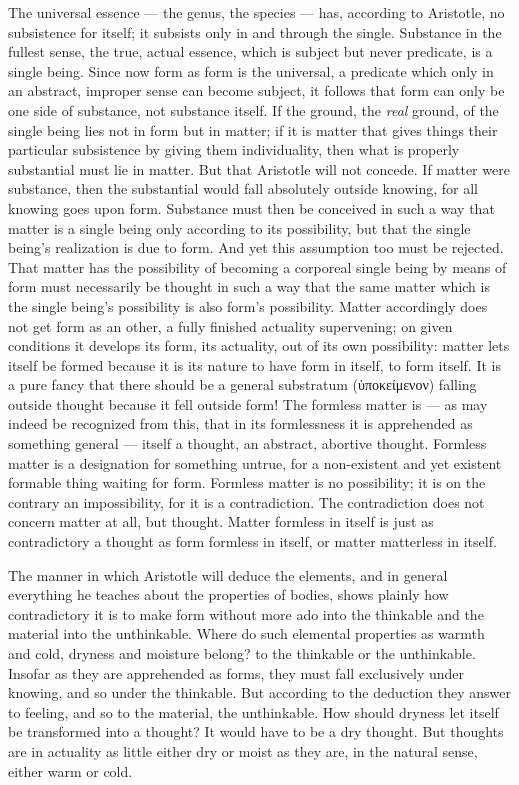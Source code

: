 \documentclass[12pt,a4paper]{book}
\begin{document}
The universal essence --- the genus, the species --- has, according to Aristotle, no subsistence for itself; it
subsists only in and through the single. Substance in the fullest sense, the true, actual essence, which is
subject but never predicate, is a single being. Since now form as form is the universal, a predicate which only
in an abstract, improper sense can become subject, it follows that form can only be one side of substance, not
substance itself. If the ground, the \emph{real} ground, of the single being lies not in form but in matter; if
it is matter that gives things their particular subsistence by giving them individuality, then what is properly
substantial must lie in matter. But that Aristotle will not concede. If matter were substance, then the
substantial would fall absolutely outside knowing, for all knowing goes upon form. Substance must then be
conceived in such a way that matter is a single being only according to
its possibility, but that the single being's realization is due to form. And yet this assumption too must be
rejected. That matter has the possibility of becoming a corporeal single being by means of form must necessarily
be thought in such a way that the same matter which is the single being's possibility is also form's possibility.
Matter accordingly does not get form as an other, a fully finished actuality supervening; on given conditions it
develops its form, its actuality, out of its own possibility: matter lets itself be formed because it is its
nature to have form in itself, to form itself. It is a pure fancy that there should be a general substratum
(ὑποκείμενον) falling outside thought because it fell outside form! The formless matter is --- as may indeed be
recognized from this, that in its formlessness it is apprehended as something general --- itself a thought, an
abstract, abortive thought. Formless matter is a designation for something untrue, for a non-existent and yet
existent formable thing waiting for form. Formless matter is no possibility; it is on the contrary an
impossibility, for it is a contradiction. The contradiction does not concern matter at all, but thought. Matter
formless in itself is just as contradictory a thought as form formless in itself, or matter matterless in itself.

The manner in which Aristotle will deduce the elements, and in general everything he teaches about the properties
of bodies, shows plainly how contradictory it is to make form without more ado into the thinkable and the
material into the unthinkable. Where do such elemental properties as warmth and cold, dryness and moisture
belong? to the thinkable or the unthinkable. Insofar as they are apprehended as forms, they must fall
exclusively under knowing, and so under the thinkable. But according to the deduction they answer to feeling, and
so to the material, the unthinkable. How should dryness let itself be transformed into a thought? It would have
to be a dry thought. But
thoughts are in actuality as little either dry or moist as they are, in the natural sense, either warm or cold.
\end{document}

